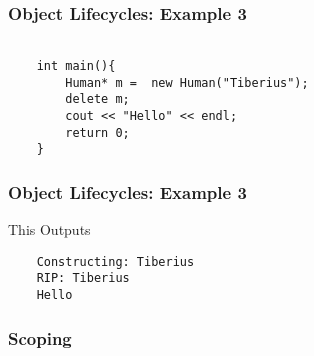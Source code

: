 \documentclass{beamer}
\begin{document}
\begin{frame}[fragile]
    \frametitle{Object Lifecycles: Example 3}
    \begin{verbatim}

    int main(){
        Human* m =  new Human("Tiberius");
        delete m;
        cout << "Hello" << endl;
        return 0;
    }
    \end{verbatim}
\end{frame}
\begin{frame}[fragile]
    \frametitle{Object Lifecycles: Example 3}
    This Outputs
    \begin{verbatim}
    Constructing: Tiberius
    RIP: Tiberius
    Hello
    \end{verbatim}

\end{frame}

\begin{frame}
    \frametitle{Scoping}
    
\end{frame}
\end{document}
